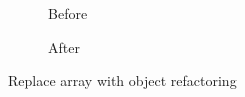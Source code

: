 \begin{figure}
  \begin{subfigure}[h]{.45\linewidth}
    
    \caption{Before}
    \label{refa:RemoveAssignment-before}    
  \end{subfigure}\hspace{1cm}
  \begin{subfigure}[h]{.45\linewidth}
    
    \caption{After}
    \label{refa:RemoveAssignment-after}
  \end{subfigure}
  \caption{Replace array with object refactoring}
  \label{refa:RemovAssignment}
\end{figure}
